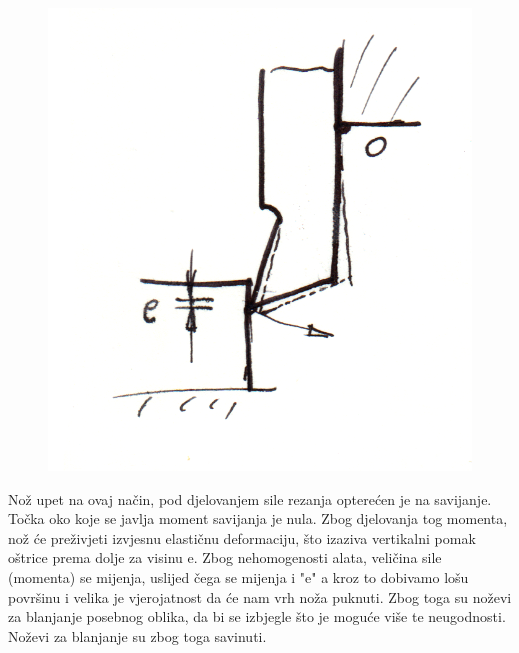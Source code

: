 \documentclass[a4paper,12pt]{article}
\numberwithin{figure}{section}
\begin{document}
\begin{figure}[!h]
\centering
\includegraphics[scale=0.15]{image_16-2.png}
\end{figure}
\FloatBarrier
Nož upet na ovaj način, pod djelovanjem sile rezanja opterećen je na savijanje. Točka oko koje se javlja moment savijanja je nula. Zbog djelovanja tog momenta, nož će preživjeti izvjesnu elastičnu deformaciju, što izaziva vertikalni pomak oštrice prema dolje za visinu e. Zbog nehomogenosti alata, veličina sile (momenta) se mijenja, uslijed čega se mijenja i "e" a kroz to dobivamo lošu površinu i velika je vjerojatnost da će nam vrh noža puknuti. Zbog toga su noževi za blanjanje posebnog oblika, da bi se izbjegle što je moguće više te neugodnosti. Noževi za blanjanje su zbog toga savinuti.
\end{document}
